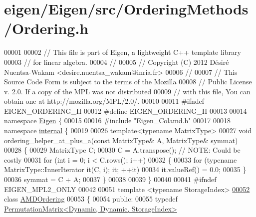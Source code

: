 \hypertarget{eigen_2_eigen_2src_2_ordering_methods_2_ordering_8h_source}{}\section{eigen/\+Eigen/src/\+Ordering\+Methods/\+Ordering.h}
\label{eigen_2_eigen_2src_2_ordering_methods_2_ordering_8h_source}

\begin{DoxyCode}
00001  
00002 \textcolor{comment}{// This file is part of Eigen, a lightweight C++ template library}
00003 \textcolor{comment}{// for linear algebra.}
00004 \textcolor{comment}{//}
00005 \textcolor{comment}{// Copyright (C) 2012  Désiré Nuentsa-Wakam <desire.nuentsa\_wakam@inria.fr>}
00006 \textcolor{comment}{//}
00007 \textcolor{comment}{// This Source Code Form is subject to the terms of the Mozilla}
00008 \textcolor{comment}{// Public License v. 2.0. If a copy of the MPL was not distributed}
00009 \textcolor{comment}{// with this file, You can obtain one at http://mozilla.org/MPL/2.0/.}
00010 
00011 \textcolor{preprocessor}{#ifndef EIGEN\_ORDERING\_H}
00012 \textcolor{preprocessor}{#define EIGEN\_ORDERING\_H}
00013 
00014 \textcolor{keyword}{namespace }\hyperlink{namespace_eigen}{Eigen} \{
00015   
00016 \textcolor{preprocessor}{#include "Eigen\_Colamd.h"}
00017 
00018 \textcolor{keyword}{namespace }\hyperlink{namespaceinternal}{internal} \{
00019     
00026 \textcolor{keyword}{template}<\textcolor{keyword}{typename} MatrixType> 
00027 \textcolor{keywordtype}{void} ordering\_helper\_at\_plus\_a(\textcolor{keyword}{const} MatrixType& A, MatrixType& symmat)
00028 \{
00029   MatrixType C;
00030   C = A.transpose(); \textcolor{comment}{// NOTE: Could be  costly}
00031   \textcolor{keywordflow}{for} (\textcolor{keywordtype}{int} i = 0; i < C.rows(); i++) 
00032   \{
00033       \textcolor{keywordflow}{for} (\textcolor{keyword}{typename} MatrixType::InnerIterator it(C, i); it; ++it)
00034         it.valueRef() = 0.0;
00035   \}
00036   symmat = C + A;
00037 \}
00038     
00039 \}
00040 
00041 \textcolor{preprocessor}{#ifndef EIGEN\_MPL2\_ONLY}
00042 
00051 \textcolor{keyword}{template} <\textcolor{keyword}{typename} StorageIndex>
\hyperlink{group___ordering_methods___module}{00052} \textcolor{keyword}{class }\hyperlink{group___ordering_methods___module_class_eigen_1_1_a_m_d_ordering}{AMDOrdering}
00053 \{
00054   \textcolor{keyword}{public}:
00055     \textcolor{keyword}{typedef} \hyperlink{group___core___module}{PermutationMatrix<Dynamic, Dynamic, StorageIndex>}

\end{DoxyCode}
